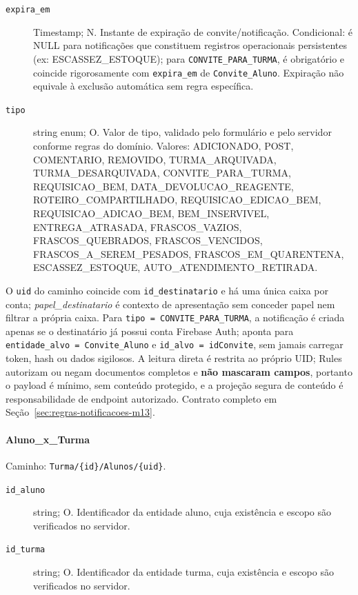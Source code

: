\begin{description}
\item[\texttt{expira\_em}] Timestamp; N. Instante de expiração de convite/notificação. Condicional: é NULL para notificações que constituem registros operacionais persistentes (ex: ESCASSEZ\_ESTOQUE); para \texttt{CONVITE\_PARA\_TURMA}, é obrigatório e coincide rigorosamente com \texttt{expira\_em} de \texttt{Convite\_Aluno}. Expiração não equivale à exclusão automática sem regra específica.
\item[\texttt{tipo}] string enum; O. Valor de tipo, validado pelo formulário e pelo servidor conforme regras do domínio. Valores: ADICIONADO, POST, COMENTARIO, REMOVIDO, TURMA\_ARQUIVADA, TURMA\_DESARQUIVADA, CONVITE\_PARA\_TURMA, REQUISICAO\_BEM, DATA\_DEVOLUCAO\_REAGENTE, ROTEIRO\_COMPARTILHADO, REQUISICAO\_EDICAO\_BEM, REQUISICAO\_ADICAO\_BEM, BEM\_INSERVIVEL, ENTREGA\_ATRASADA, FRASCOS\_VAZIOS, FRASCOS\_QUEBRADOS, FRASCOS\_VENCIDOS, FRASCOS\_A\_SEREM\_PESADOS, FRASCOS\_EM\_QUARENTENA, ESCASSEZ\_ESTOQUE, AUTO\_ATENDIMENTO\_RETIRADA.
\end{description}

\noindent O \texttt{uid} do caminho coincide com \texttt{id\_destinatario} e há uma única caixa por conta; \textit{papel\_destinatario} é contexto de apresentação sem conceder papel nem filtrar a própria caixa. Para \texttt{tipo = CONVITE\_PARA\_TURMA}, a notificação é criada apenas se o destinatário já possui conta Firebase Auth; aponta para \texttt{entidade\_alvo = Convite\_Aluno} e \texttt{id\_alvo = idConvite}, sem jamais carregar token, hash ou dados sigilosos. A leitura direta é restrita ao próprio UID; Rules autorizam ou negam documentos completos e \textbf{não mascaram campos}, portanto o payload é mínimo, sem conteúdo protegido, e a projeção segura de conteúdo é responsabilidade de endpoint autorizado. Contrato completo em Seção~\ref{sec:regras-notificacoes-m13}.

\paragraph{Aluno\_x\_Turma}\mbox{}\par
Caminho: \texttt{Turma/\{id\}/Alunos/\{uid\}}.
\begin{description}
\item[\texttt{id\_aluno}] string; O. Identificador da entidade aluno, cuja existência e escopo são verificados no servidor.
\item[\texttt{id\_turma}] string; O. Identificador da entidade turma, cuja existência e escopo são verificados no servidor.
\end{description}

